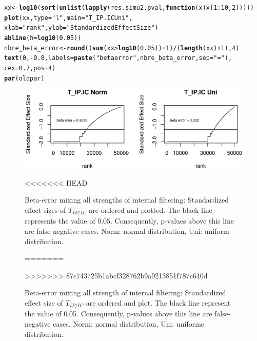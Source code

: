 \documentclass[12pt]{article}\usepackage[]{graphicx}\usepackage[]{color}
\makeatletter
\def\maxwidth{ %
  \ifdim\Gin@nat@width>\linewidth
    \linewidth
  \else
    \Gin@nat@width
  \fi
}
\newcommand{\hlnum}[1]{\textcolor[rgb]{0.686,0.059,0.569}{#1}}%
\newcommand{\hlstr}[1]{\textcolor[rgb]{0.192,0.494,0.8}{#1}}%
\newcommand{\hlopt}[1]{\textcolor[rgb]{0,0,0}{#1}}%
\newcommand{\hlstd}[1]{\textcolor[rgb]{0.345,0.345,0.345}{#1}}%
\newcommand{\hlkwa}[1]{\textcolor[rgb]{0.161,0.373,0.58}{\textbf{#1}}}%
\newcommand{\hlkwb}[1]{\textcolor[rgb]{0.69,0.353,0.396}{#1}}%
\newcommand{\hlkwc}[1]{\textcolor[rgb]{0.333,0.667,0.333}{#1}}%
\newcommand{\hlkwd}[1]{\textcolor[rgb]{0.737,0.353,0.396}{\textbf{#1}}}%
\newenvironment{kframe}{%
 \def\at@end@of@kframe{}%
 \ifinner\ifhmode%
  \def\at@end@of@kframe{\end{minipage}}%
  \begin{minipage}{\columnwidth}%
 \fi\fi%
 \def\FrameCommand##1{\hskip\@totalleftmargin \hskip-\fboxsep
 \colorbox{shadecolor}{##1}\hskip-\fboxsep
     \hskip-\linewidth \hskip-\@totalleftmargin \hskip\columnwidth}%
 \MakeFramed {\advance\hsize-\width
   \@totalleftmargin\z@ \linewidth\hsize
   \@setminipage}}%
 {\par\unskip\endMakeFramed%
 \at@end@of@kframe}
\newenvironment{knitrout}{}{} %
\makeatother
\begin{document}
\begin{landscape}
\begin{knitrout}
\begin{kframe}
\begin{alltt}
\hlstd{xx} \hlkwb{<-} \hlkwd{log10}\hlstd{(}\hlkwd{sort}\hlstd{(}\hlkwd{unlist}\hlstd{(}\hlkwd{lapply}\hlstd{(res.simu2.pval,} \hlkwa{function}\hlstd{(}\hlkwc{x}\hlstd{) x[}\hlnum{1}\hlopt{:}\hlnum{10}\hlstd{,} \hlnum{2}\hlstd{]))))}
\hlkwd{plot}\hlstd{(xx,} \hlkwc{type} \hlstd{=} \hlstr{"l"}\hlstd{,} \hlkwc{main} \hlstd{=} \hlstr{"T_IP.IC Uni"}\hlstd{,}
     \hlkwc{xlab} \hlstd{=} \hlstr{"rank"}\hlstd{,} \hlkwc{ylab} \hlstd{=} \hlstr{"Standardized Effect Size"}\hlstd{)}
\hlkwd{abline}\hlstd{(}\hlkwc{h} \hlstd{=} \hlkwd{log10}\hlstd{(}\hlnum{0.05}\hlstd{))}
\hlstd{nbre_beta_error} \hlkwb{<-} \hlkwd{round}\hlstd{((}\hlkwd{sum}\hlstd{(xx}\hlopt{>}\hlkwd{log10}\hlstd{(}\hlnum{0.05}\hlstd{))}\hlopt{+}\hlnum{1}\hlstd{)}\hlopt{/}\hlstd{(}\hlkwd{length}\hlstd{(xx)}\hlopt{+}\hlnum{1}\hlstd{),} \hlnum{4}\hlstd{)}
\hlkwd{text}\hlstd{(}\hlnum{0}\hlstd{,} \hlopt{-}\hlnum{0.8}\hlstd{,} \hlkwc{labels} \hlstd{=} \hlkwd{paste}\hlstd{(}\hlstr{"beta error"}\hlstd{, nbre_beta_error,} \hlkwc{sep} \hlstd{=} \hlstr{" = "}\hlstd{),}
  \hlkwc{cex} \hlstd{=} \hlnum{0.7}\hlstd{,} \hlkwc{pos} \hlstd{=} \hlnum{4}\hlstd{)}
\hlkwd{par}\hlstd{(oldpar)}
\end{alltt}
\end{kframe}\begin{figure}

{\centering \includegraphics[width=\maxwidth]{figure/Internal_filter_results_pval_local-1} 

}

<<<<<<< HEAD
\caption[Beta-error mixing all strengths of internal filtering]{Beta-error mixing all strengths of internal filtering: Standardized effect sizes of $T_{IP/IC}$ are ordered and plotted. The black line represents the value of 0.05. Consequently, p-values above this line are false-negative cases. Norm: normal distribution, Uni: uniform distribution. }\label{fig:Internal_filter_results_pval_local}
=======
\caption[Beta-error mixing all strength of internal filtering]{Beta-error mixing all strength of internal filtering: Standardized effect size of $T_{IP/IC}$ are ordered and plot. The black line represent the value of 0.05. Consequently, p-values above this line are false-negative cases. Norm: normal distribution, Uni: uniforme distribution. }\label{fig:Internal_filter_results_pval_local}
>>>>>>> 87c743725b1abcf328762b9a9213851f787c640d
\end{figure}



\end{knitrout}
\end{landscape}
\end{document}
